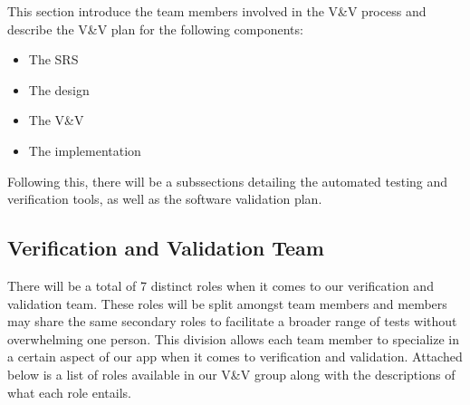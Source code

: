 \documentclass[12pt, titlepage]{article}
\begin{document}
This section introduce the team members involved in the V\&V process and
describe the V\&V plan for the following components:
\begin{itemize}
	\item The SRS
	\item The design
	\item The V\&V
	\item The implementation
\end{itemize}
Following this, there will be a subssections detailing the automated testing and
verification tools, as well as the software validation plan.


\newpage
\subsection{Verification and Validation Team}

There will be a total of 7 distinct roles when it comes to our verification and validation team.
These roles will be split amongst team members and members may share the same secondary roles to facilitate a broader range of tests without overwhelming one person.
This division allows each team member to specialize in a certain aspect of our app when it comes to verification and validation. 
Attached below is a list of roles available in our V\&V group along with the descriptions of what each role entails. \\
\end{document}

